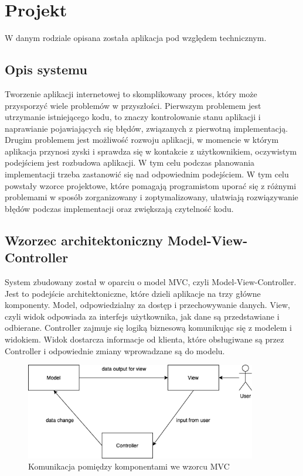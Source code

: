\chapter{Projekt}
\thispagestyle{chapterBeginStyle}
W danym rodziale opisana została aplikacja pod względem technicznym. 

\section{Opis systemu}
Tworzenie aplikacji internetowej to skomplikowany proces, który może przysporzyć wiele problemów w przyszłości. Pierwszym problemem jest utrzymanie istniejącego kodu, to znaczy kontrolowanie stanu aplikacji i naprawianie pojawiających się błędów, związanych z pierwotną implementacją. Drugim problemem jest możliwość rozwoju aplikacji, w momencie w którym aplikacja przynosi zyski i sprawdza się w kontakcie z użytkownikiem, oczywistym podejściem jest rozbudowa aplikacji. W tym celu podczas planowania implementacji trzeba zastanowić się nad odpowiednim podejściem. W tym celu powstały wzorce projektowe, które pomagają programistom uporać się z różnymi problemami w sposób zorganizowany i zoptymalizowany, ułatwiają rozwiązywanie błędów podczas implementacji oraz zwiększają czytelność kodu.

\section{Wzorzec architektoniczny Model-View-Controller}
System zbudowany został w oparciu o model MVC, czyli Model-View-Controller.
Jest to podejście architektoniczne, które dzieli aplikacje na trzy główne komponenty.
Model, odpowiedzialny za dostęp i przechowywanie danych. View, czyli widok odpowiada za interfejs użytkownika, jak dane są przedstawiane i odbierane. Controller zajmuje się logiką biznesową komunikując się z modelem i widokiem. Widok dostarcza informacje od klienta, które obsługiwane są przez Controller i odpowiednie zmiany wprowadzane są do modelu. \cite{6827095}

\begin{figure}[h]

	\centering
		\includegraphics[width=0.90\textwidth]{mvc-diagram}		
		\caption{Komunikacja pomiędzy komponentami we wzorcu MVC }
\end{figure}


